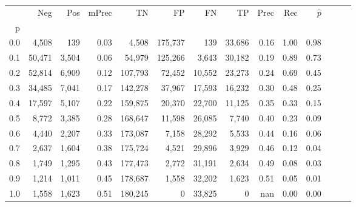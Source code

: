 \begin{tabular}{rrrrrrrrrrrrrr}
\toprule
{} &     Neg &    Pos & mPrec &       TN &       FP &      FN &      TP &  Prec &   Rec & $\hat{p}$ \\
p   &         &        &       &          &          &         &         &       &       &           \\
\midrule
0.0 &   4,508 &    139 &  0.03 &    4,508 &  175,737 &     139 &  33,686 &  0.16 &  1.00 &      0.98 \\
0.1 &  50,471 &  3,504 &  0.06 &   54,979 &  125,266 &   3,643 &  30,182 &  0.19 &  0.89 &      0.73 \\
0.2 &  52,814 &  6,909 &  0.12 &  107,793 &   72,452 &  10,552 &  23,273 &  0.24 &  0.69 &      0.45 \\
0.3 &  34,485 &  7,041 &  0.17 &  142,278 &   37,967 &  17,593 &  16,232 &  0.30 &  0.48 &      0.25 \\
0.4 &  17,597 &  5,107 &  0.22 &  159,875 &   20,370 &  22,700 &  11,125 &  0.35 &  0.33 &      0.15 \\
0.5 &   8,772 &  3,385 &  0.28 &  168,647 &   11,598 &  26,085 &   7,740 &  0.40 &  0.23 &      0.09 \\
0.6 &   4,440 &  2,207 &  0.33 &  173,087 &    7,158 &  28,292 &   5,533 &  0.44 &  0.16 &      0.06 \\
0.7 &   2,637 &  1,604 &  0.38 &  175,724 &    4,521 &  29,896 &   3,929 &  0.46 &  0.12 &      0.04 \\
0.8 &   1,749 &  1,295 &  0.43 &  177,473 &    2,772 &  31,191 &   2,634 &  0.49 &  0.08 &      0.03 \\
0.9 &   1,214 &  1,011 &  0.45 &  178,687 &    1,558 &  32,202 &   1,623 &  0.51 &  0.05 &      0.01 \\
1.0 &   1,558 &  1,623 &  0.51 &  180,245 &        0 &  33,825 &       0 &   nan &  0.00 &      0.00 \\
\bottomrule
\end{tabular}
